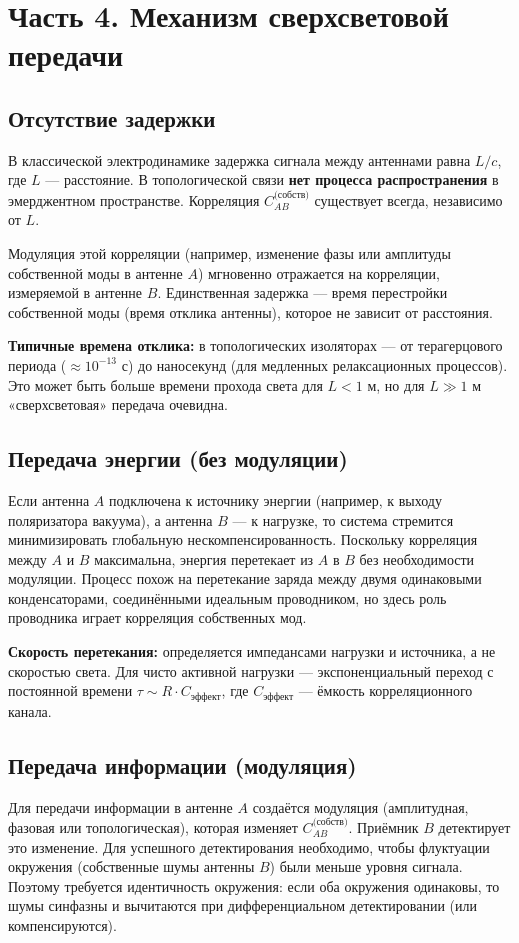 \documentclass[a4paper,12pt]{article}
\begin{document}
\section*{Часть 4. Механизм сверхсветовой передачи}

\subsection{Отсутствие задержки}
В классической электродинамике задержка сигнала между антеннами равна \(L/c\), где \(L\) — расстояние. В топологической связи \textbf{нет процесса распространения} в эмерджентном пространстве. Корреляция \(C_{AB}^{\text{(собств)}}\) существует всегда, независимо от \(L\).

Модуляция этой корреляции (например, изменение фазы или амплитуды собственной моды в антенне \(A\)) мгновенно отражается на корреляции, измеряемой в антенне \(B\). Единственная задержка — время перестройки собственной моды (время отклика антенны), которое не зависит от расстояния.

\textbf{Типичные времена отклика:} в топологических изоляторах — от терагерцового периода (\(\approx 10^{-13}\) с) до наносекунд (для медленных релаксационных процессов). Это может быть больше времени прохода света для \(L < 1\) м, но для \(L \gg 1\) м «сверхсветовая» передача очевидна.

\subsection{Передача энергии (без модуляции)}
Если антенна \(A\) подключена к источнику энергии (например, к выходу поляризатора вакуума), а антенна \(B\) — к нагрузке, то система стремится минимизировать глобальную нескомпенсированность. Поскольку корреляция между \(A\) и \(B\) максимальна, энергия перетекает из \(A\) в \(B\) без необходимости модуляции. Процесс похож на перетекание заряда между двумя одинаковыми конденсаторами, соединёнными идеальным проводником, но здесь роль проводника играет корреляция собственных мод.

\textbf{Скорость перетекания:} определяется импедансами нагрузки и источника, а не скоростью света. Для чисто активной нагрузки — экспоненциальный переход с постоянной времени \(\tau \sim R \cdot C_{\text{эффект}}\), где \(C_{\text{эффект}}\) — ёмкость корреляционного канала.

\subsection{Передача информации (модуляция)}
Для передачи информации в антенне \(A\) создаётся модуляция (амплитудная, фазовая или топологическая), которая изменяет \(C_{AB}^{\text{(собств)}}\). Приёмник \(B\) детектирует это изменение. Для успешного детектирования необходимо, чтобы флуктуации окружения (собственные шумы антенны \(B\)) были меньше уровня сигнала. Поэтому требуется идентичность окружения: если оба окружения одинаковы, то шумы синфазны и вычитаются при дифференциальном детектировании (или компенсируются).
\end{document}
